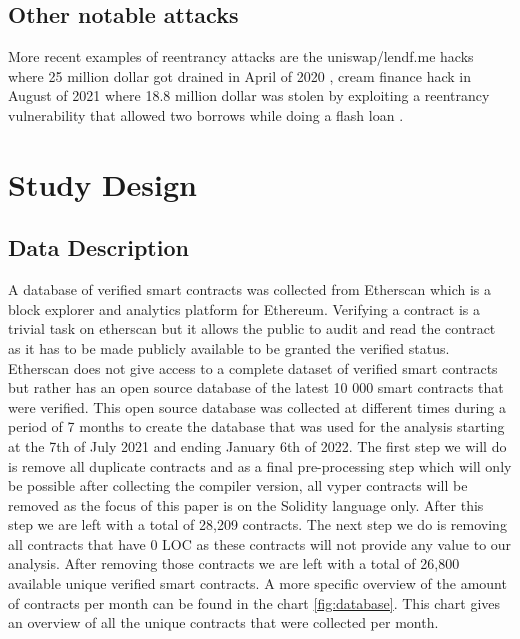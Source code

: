 \documentclass[sigconf]{acmart}
\begin{document}
\subsection{Other notable attacks}
More recent examples of reentrancy attacks are the uniswap/lendf.me hacks where 25 million dollar got drained in April of 2020 \cite{lendf}, cream finance hack in August of 2021 where 18.8 million dollar was stolen by exploiting a reentrancy vulnerability that allowed two borrows while doing a flash loan \cite{cream}.

\section{Study Design}
\subsection{Data Description}
A database of verified smart contracts was collected from Etherscan which is a block explorer and analytics platform for Ethereum. Verifying a contract is a trivial task on etherscan but it allows the public to audit and read the contract as it has to be made publicly available to be granted the verified status. Etherscan does not give access to a complete dataset of verified smart contracts but rather has an open source database of the latest 10 000 smart contracts that were verified. This open source database was collected at different times during a period of 7 months to create the database that was used for the analysis starting at the 7th of July 2021 and ending January 6th of 2022. The first step we will do is remove all duplicate contracts and as a final pre-processing step which will only be possible after collecting the compiler version, all vyper contracts will be removed as the focus of this paper is on the Solidity language only. After this step we are left with a total of 28,209 contracts. The next step we do is removing all contracts that have 0 LOC as these contracts will not provide any value to our analysis. After removing those contracts we are left with a total of 26,800 available unique verified smart contracts.
A more specific overview of the amount of contracts per month can be found in the chart \ref{fig:database}. This chart gives an overview of all the unique contracts that were collected per month.
\end{document}
